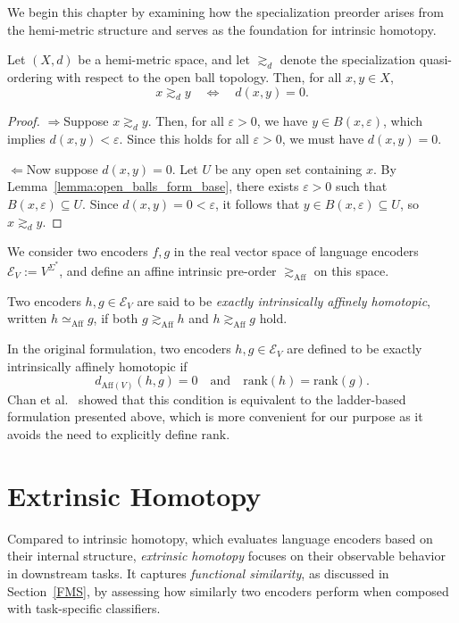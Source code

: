 We begin this chapter by examining how the specialization preorder arises from the hemi-metric structure and serves as the foundation for intrinsic homotopy.

\begin{lemma}\label{lemma:quasi-ordering}
Let $(X, d)$ be a hemi-metric space, and let $\gtrsim_d$ denote the specialization quasi-ordering with respect to the open ball topology. Then, for all $x, y \in X$,
\[
x \gtrsim_d y \quad \Longleftrightarrow \quad d(x, y) = 0.
\]
\end{lemma}



\begin{proof}
\glqq$\Rightarrow $\grqq  Suppose $x \gtrsim_d y$.
Then, for all $\varepsilon > 0$, we have $y \in B(x, \varepsilon)$, which implies $d(x, y) < \varepsilon$. 
Since this holds for all $\varepsilon > 0$, we must have $d(x, y) = 0$.

\glqq$\Leftarrow$\grqq Now suppose $d(x, y) = 0$. Let $U$ be any open set containing $x$. 
By Lemma~\ref{lemma:open_balls_form_base}, there exists $\varepsilon > 0$ such that $B(x, \varepsilon) \subseteq U$.
Since $d(x, y) = 0 < \varepsilon$, it follows that $y \in B(x, \varepsilon) \subseteq U$, so $x \gtrsim_d y$.
\end{proof}


We consider two encoders \( f, g \) in the real vector space of language encoders \( \mathcal{E}_V := V^{\Sigma^*} \), and define an affine intrinsic pre-order \( \gtrsim_{\mathrm{Aff}} \) on this space.

\begin{definition}
Two encoders \( h, g \in \mathcal{E}_V \) are said to be \textit{exactly intrinsically affinely homotopic}, written \( h \simeq_{\mathrm{Aff}} g \), if both \( g \gtrsim_{\mathrm{Aff}} h \) and \( h \gtrsim_{\mathrm{Aff}} g \) hold.
\end{definition}

In the original formulation, two encoders \( h, g \in \mathcal{E}_V \) are defined to be exactly intrinsically affinely homotopic if
\[
d_{\mathrm{Aff}(V)}(h, g) = 0 \quad \text{and} \quad \mathrm{rank}(h) = \mathrm{rank}(g).
\]
Chan et al.~\cite{chan_affine_2024} showed that this condition is equivalent to the ladder-based formulation presented above, which is more convenient for our purpose as it avoids the need to explicitly define \(\mathrm{rank}\).


\section{Extrinsic Homotopy}\label{EH}
Compared to intrinsic homotopy, which evaluates language encoders based on their internal structure, \emph{extrinsic homotopy} focuses on their observable behavior in downstream tasks.  
It captures \emph{functional similarity}, as discussed in Section~\ref{FMS}, by assessing how similarly two encoders perform when composed with task-specific classifiers.

